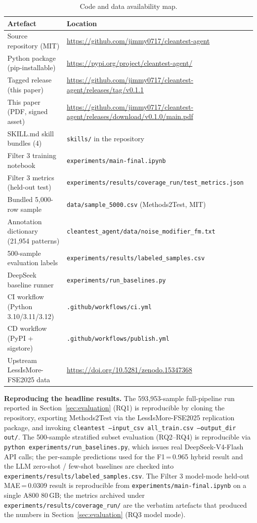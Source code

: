 \documentclass[acmlarge,nonacm,screen]{acmart}
\begin{document}
\begin{table}[htbp]
\centering
\small
\caption{Code and data availability map.}
\label{tab:availability}
\begin{tabularx}{\linewidth}{@{}lY@{}}
\toprule
\textbf{Artefact} & \textbf{Location} \\
\midrule
Source repository (MIT)            & \url{https://github.com/jimmy0717/cleantest-agent} \\
Python package (pip-installable)   & \url{https://pypi.org/project/cleantest-agent/} \\
Tagged release (this paper)        & \url{https://github.com/jimmy0717/cleantest-agent/releases/tag/v0.1.1} \\
This paper (PDF, signed asset)     & \url{https://github.com/jimmy0717/cleantest-agent/releases/download/v0.1.0/main.pdf} \\
SKILL.md skill bundles (4)         & \texttt{skills/} in the repository \\
Filter 3 training notebook         & \texttt{experiments/main-final.ipynb} \\
Filter 3 metrics (held-out test)   & \texttt{experiments/results/coverage\_run/test\_metrics.json} \\
Bundled 5{,}000-row sample         & \texttt{data/sample\_5000.csv} (Methods2Test, MIT) \\
Annotation dictionary (21{,}954 patterns) & \texttt{cleantest\_agent/data/noise\_modifier\_fm.txt} \\
500-sample evaluation labels       & \texttt{experiments/results/labeled\_samples.csv} \\
DeepSeek baseline runner           & \texttt{experiments/run\_baselines.py} \\
CI workflow (Python 3.10/3.11/3.12) & \texttt{.github/workflows/ci.yml} \\
CD workflow (PyPI + sigstore)      & \texttt{.github/workflows/publish.yml} \\
Upstream LessIsMore-FSE2025 data   & \url{https://doi.org/10.5281/zenodo.15347368} \\
\bottomrule
\end{tabularx}
\end{table}

\textbf{Reproducing the headline results.}
The 593{,}953-sample full-pipeline run reported in
Section~\ref{sec:evaluation} (RQ1) is reproducible by cloning the
repository, exporting Methods2Test via the LessIsMore-FSE2025
replication package, and invoking
\texttt{cleantest --input\_csv all\_train.csv --output\_dir out/}.
The 500-sample stratified subset evaluation (RQ2--RQ4) is
reproducible via
\texttt{python experiments/run\_baselines.py}, which issues real
DeepSeek-V4-Flash API calls; the per-sample predictions used for
the F1\,=\,0.965 hybrid result and the LLM zero-shot / few-shot
baselines are checked into
\texttt{experiments/results/labeled\_samples.csv}. The Filter 3
model-mode held-out MAE\,=\,0.0309 result is reproducible from
\texttt{experiments/main-final.ipynb} on a single A800 80\,GB; the
metrics archived under
\texttt{experiments/results/coverage\_run/} are the verbatim
artefacts that produced the numbers in
Section~\ref{sec:evaluation} (RQ3 model mode).
\end{document}
